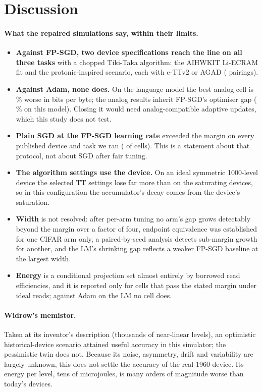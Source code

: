 \section{Discussion}\label{sec:discussion}
\paragraph{What the repaired simulations say, within their limits.}
\begin{itemize}
\item \textbf{Against FP-SGD, two device specifications reach the line on all three tasks} with a chopped Tiki-Taka algorithm:
      the AIHWKIT Li-ECRAM fit and the protonic-inspired scenario, each with c-TTv2 or AGAD (\RVAllThreeFpN{} pairings).
\item \textbf{Against Adam, none does.} On the language model the best analog cell is \RVLmAdamBestGap\,\% worse in bits per
      byte; the analog results inherit FP-SGD's optimiser gap (\RVLmFpSgdVsAdamPct\,\% on this model). Closing it would need
      analog-compatible adaptive updates, which this study does not test.
\item \textbf{Plain SGD at the FP-SGD learning rate} exceeded the margin on every published device and task we ran
      (\RVSgdPubFail{} of \RVSgdPubN{} cells). This is a statement about that protocol, not about SGD after fair tuning.
\item \textbf{The algorithm settings use the device.} On an ideal symmetric 1000-level device the selected TT settings lose
      far more than on the saturating devices, so in this configuration the accumulator's decay comes from the device's
      saturation.
\item \textbf{Width} is not resolved: after per-arm tuning no arm's gap grows detectably beyond the margin over a factor of
      four, endpoint equivalence was established for one CIFAR arm only, a paired-by-seed analysis detects sub-margin growth for
      another, and the LM's shrinking gap reflects a weaker FP-SGD baseline at the largest width.
\item \textbf{Energy} is a conditional projection set almost entirely by borrowed read efficiencies, and it is reported only
      for cells that pass the stated margin under ideal reads; against Adam on the LM no cell does.
\end{itemize}

\paragraph{Widrow's memistor.} Taken at its inventor's description (thousands of near-linear levels), an optimistic
historical-device scenario attained useful accuracy in this simulator; the pessimistic twin does not. Because its noise,
asymmetry, drift and variability are largely unknown, this does not settle the accuracy of the real 1960 device. Its energy per
level, tens of microjoules, is many orders of magnitude worse than today's devices.

